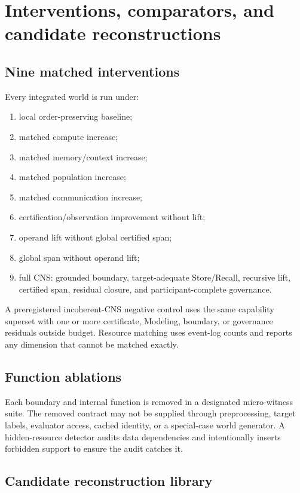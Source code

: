 \documentclass[11pt]{article}
\begin{document}
\section{Interventions, comparators, and candidate reconstructions}

\subsection{Nine matched interventions}

Every integrated world is run under:
\begin{enumerate}
\item local order-preserving baseline;
\item matched compute increase;
\item matched memory/context increase;
\item matched population increase;
\item matched communication increase;
\item certification/observation improvement without lift;
\item operand lift without global certified span;
\item global span without operand lift;
\item full CNS: grounded boundary, target-adequate Store/Recall, recursive lift, certified span, residual closure, and participant-complete governance.
\end{enumerate}
A preregistered incoherent-CNS negative control uses the same capability superset with one or more certificate, Modeling, boundary, or governance residuals outside budget. Resource matching uses event-log counts and reports any dimension that cannot be matched exactly.

\subsection{Function ablations}

Each boundary and internal function is removed in a designated micro-witness suite. The removed contract may not be supplied through preprocessing, target labels, evaluator access, cached identity, or a special-case world generator. A hidden-resource detector audits data dependencies and intentionally inserts forbidden support to ensure the audit catches it.

\subsection{Candidate reconstruction library}
\end{document}
